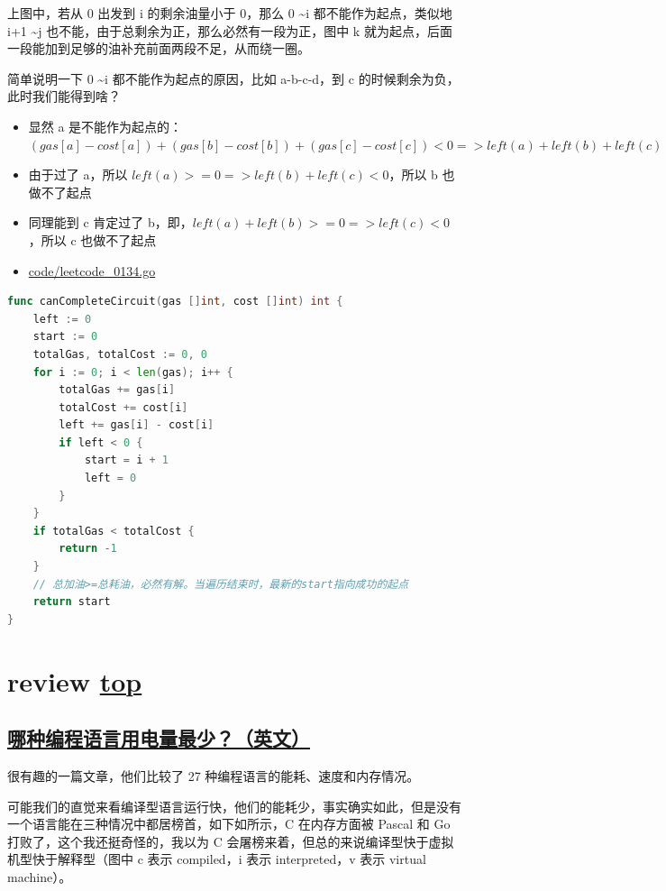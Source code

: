 上图中，若从 0 出发到 i 的剩余油量小于 0，那么 0 \textasciitilde i 都不能作为起点，类似地 i+1 \textasciitilde j 也不能，由于总剩余为正，那么必然有一段为正，图中 k 就为起点，后面一段能加到足够的油补充前面两段不足，从而绕一圈。

简单说明一下 0 \textasciitilde i 都不能作为起点的原因，比如 a-b-c-d，到 c 的时候剩余为负，此时我们能得到啥？

\begin{itemize}
\item 显然 a 是不能作为起点的：$ (gas[a]-cost[a])+(gas[b]-cost[b])+(gas[c]-cost[c])<0 => left(a)+left(b)+left(c)<0 $
\item 由于过了 a，所以 $ left(a) >= 0 => left(b)+left(c)<0 $，所以 b 也做不了起点
\item 同理能到 c 肯定过了 b，即，$ left(a)+left(b)>=0 => left(c)<0 $，所以 c 也做不了起点
\end{itemize}

\begin{itemize}
  \item \href{https://github.com/taseikyo/arts/blob/master/code/leetcode_0134.go}{code/leetcode\_0134.go}
\end{itemize}

\begin{lstlisting}[language=go]
func canCompleteCircuit(gas []int, cost []int) int {
	left := 0
	start := 0
	totalGas, totalCost := 0, 0
	for i := 0; i < len(gas); i++ {
		totalGas += gas[i]
		totalCost += cost[i]
		left += gas[i] - cost[i]
		if left < 0 {
			start = i + 1
			left = 0
		}
	}
	if totalGas < totalCost {
		return -1
	}
	// 总加油>=总耗油，必然有解。当遍历结束时，最新的start指向成功的起点
	return start
}
\end{lstlisting}

\section{review \hyperref[chap:w4]{top}}\label{w4:review}

\subsection{\href{https://thenewstack.io/which-programming-languages-use-the-least-electricity/}{哪种编程语言用电量最少？（英文）}}

很有趣的一篇文章，他们比较了 27 种编程语言的能耗、速度和内存情况。

可能我们的直觉来看编译型语言运行快，他们的能耗少，事实确实如此，但是没有一个语言能在三种情况中都居榜首，如下如所示，C 在内存方面被 Pascal 和 Go 打败了，这个我还挺奇怪的，我以为 C 会屠榜来着，但总的来说编译型快于虚拟机型快于解释型（图中 c 表示 compiled，i 表示 interpreted，v 表示 virtual machine）。

